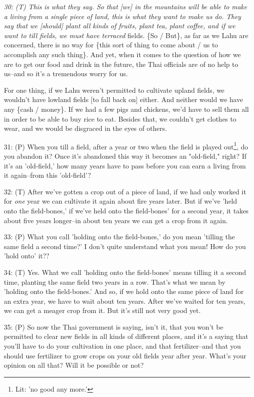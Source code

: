 \textit{30: (T) This is what they say. So that [we] in the mountains will be able
to make a living from a single piece of land, this is what they want to make us
do. They say that we [should] plant all kinds of fruits, plant tea, plant coffee,
and if we want to till fields, we must have terraced} fields. \{So / But\}, as
far as we Lahu are concerned, there is no way for \{this sort of thing to come
about / us to accomplish any such thing\}. And yet, when it comes to the question
of how we are to get our food and drink in the future, the Thai officials are of
no help to us--and so it's a tremendous worry for us.

For one thing, if we Lahu weren't permitted to cultivate upland fields, we wouldn't
have lowland fields [to fall back on] either. And neither would we have any \{cash
/ money\}. If we had a few pigs and chickens, we'd have to sell them all in order
to be able to buy rice to eat. Besides that, we couldn't get clothes to wear, and
we would be disgraced in the eyes of others.

31: (P) When you till a field, after a year or two when the field is played out\footnote{Lit: 'no good any more.'},
do you abandon it? Once it's abandoned this way it becomes an "old-field,"
right? If it's an 'old-field,' how many years have to pass before you can earn
a living from it again--from this 'old-field'?

32: (T) After we've gotten a crop out of a piece of land, if we had only worked
it for \textit{one} year we can cultivate it again about fire years later. But
if we've 'held onto the field-bones,' if we've held onto the field-bones' for a
second year, it takes about five years longer--in about ten years we can get a
crop from it again.

33: (P) What you call 'holding onto the field-bones,' do you mean 'tilling the
same field a second time?' I don't quite understand what you mean! How do you 'hold
onto' it??

34: (T) Yes. What we call 'holding onto the field-bones' means tilling it a second
time, planting the same field two years in a row. That's what we mean by 'holding
onto the field-bones.' And so, if we hold onto the same piece of land for an extra
year, we have to wait about ten years. After we've waited for ten years, we can
get a meager crop from it. But it's still not very good yet.

35: (P) So now the Thai government is saying, isn't it, that you won't be permitted
to clear new fields in all kinds of different places, and it's a saying that you'll
have to do your cultivation in one place, and that fertilizer--and that you should
use fertilizer to grow crops on your old fields year after year. What's your opinion
on all that? Will it be possible or not?

